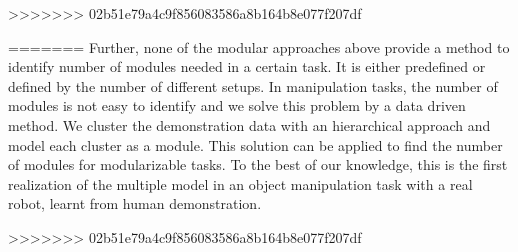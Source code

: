 
>>>>>>> 02b51e79a4c9f856083586a8b164b8e077f207df

=======
Further, none of the modular approaches above provide a method to identify number of modules needed in a certain task. It is either predefined or defined by the number of different setups. In manipulation tasks, the number of modules is not easy to identify and we solve this problem by a data driven method. We cluster the demonstration data with an hierarchical approach and model each cluster as a module. This solution can be applied to find the number of modules for modularizable tasks. To the best of our knowledge, this is the first realization of the multiple model in an object manipulation task with a real robot, learnt from human demonstration.



>>>>>>> 02b51e79a4c9f856083586a8b164b8e077f207df

%
%
%




